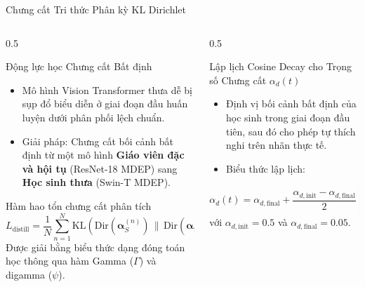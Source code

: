 \documentclass[aspectratio=169, 10pt]{beamer}
\newcommand{\Dir}{\text{Dir}}
\newcommand{\KL}{\text{KL}}
\begin{document}
\begin{frame}{Chưng cất Tri thức Phân kỳ KL Dirichlet}
  \begin{columns}
    \begin{column}{0.5\textwidth}
      \begin{block}{Động lực học Chưng cất Bất định}
        \begin{itemize}
          \item Mô hình Vision Transformer thưa dễ bị sụp đổ biểu diễn ở giai đoạn đầu huấn luyện dưới phân phối lệch chuẩn.
          \item Giải pháp: Chưng cất bối cảnh bất định từ một mô hình \textbf{Giáo viên đặc và hội tụ} (ResNet-18 MDEP) sang \textbf{Học sinh thưa} (Swin-T MDEP).
        \end{itemize}
      \end{block}
      \begin{block}{Hàm hao tổn chưng cất phân tích}
        $$L_{\text{distill}} = \frac{1}{N}\sum_{n=1}^N \KL\!\left(\Dir(\bm{\alpha}_{S}^{(n)}) \,\|\, \Dir(\bm{\alpha}_{T}^{(n)})\right)$$
        Được giải bằng biểu thức dạng đóng toán học thông qua hàm Gamma ($\Gamma$) và digamma ($\psi$).
      \end{block}
    \end{column}
    \begin{column}{0.5\textwidth}
      \begin{exampleblock}{Lập lịch Cosine Decay cho Trọng số Chưng cất $\alpha_d(t)$}
        \begin{itemize}
          \item Định vị bối cảnh bất định của học sinh trong giai đoạn đầu tiên, sau đó cho phép tự thích nghi trên nhãn thực tế.
          \item Biểu thức lập lịch:
        \end{itemize}
        $$\alpha_d(t) = \alpha_{d,\text{final}} + \frac{\alpha_{d,\text{init}} - \alpha_{d,\text{final}}}{2}\left[1 + \cos\left(\pi \frac{t - t_w}{T - t_w}\right)\right]$$
        với $\alpha_{d,\text{init}} = 0.5$ và $\alpha_{d,\text{final}} = 0.05$.
      \end{exampleblock}
    \end{column}
  \end{columns}
\end{frame}
\end{document}
